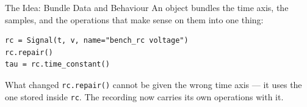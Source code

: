 \documentclass[9pt,aspectratio=169,xcolor=table]{beamer}
\begin{document}
\begin{frame}[fragile]{The Idea: Bundle Data and Behaviour}
    \leavevmode
    An \alert{object} bundles the time axis, the samples, and the
    operations that make sense on them into one thing:

\begin{lstlisting}
rc = Signal(t, v, name="bench_rc voltage")
rc.repair()
tau = rc.time_constant()
\end{lstlisting}

    \vspace{2mm}
    \begin{block}{What changed}
        \texttt{rc.repair()} \alert{cannot} be given the wrong time axis
        --- it uses the one stored inside \texttt{rc}. The recording now
        carries its own operations with it.
    \end{block}
\end{frame}
\end{document}
